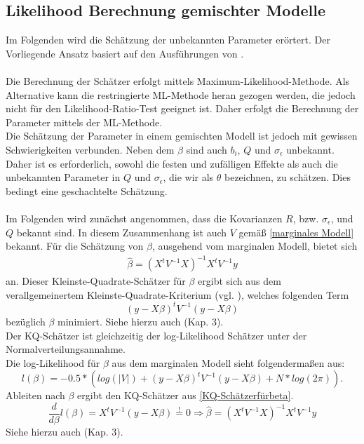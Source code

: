 \documentclass[%
thesis=student,%
coverpage=false,%
titlepage=false,%
headmarks=true, %
german,%
font=libertine, %
math=newpxtx, %
BCOR=5mm,%
coverBCOR=11mm%
]{tumbook}
\theoremstyle{break}
\begin{document}
\subsection{Likelihood Berechnung gemischter Modelle}
Im Folgenden wird die Schätzung der unbekannten Parameter erörtert. Der Vorliegende Ansatz basiert auf den Ausführungen von \cite{fahrmeir-2011-regression}.\\
\\
Die Berechnung der Schätzer erfolgt mittels Maximum-Likelihood-Methode. Als Alternative kann die restringierte ML-Methode heran gezogen werden, die jedoch nicht für den Likelihood-Ratio-Test geeignet ist. Daher erfolgt die Berechnung der Parameter mittels der ML-Methode.\\
Die Schätzung der Parameter in einem gemischten Modell ist jedoch mit gewissen Schwierigkeiten verbunden. Neben dem $\beta$ sind auch $b_i$, $Q$ und $\sigma_\epsilon$ unbekannt. Daher ist es erforderlich, sowohl die festen und zufälligen Effekte als auch die unbekannten Parameter in $Q$ und $\sigma_\epsilon$, die wir als $\theta$ bezeichnen, zu schätzen. Dies bedingt eine geschachtelte Schätzung.\\
\\
Im Folgenden wird zunächst angenommen, dass die Kovarianzen $R$, bzw. $\sigma_\epsilon$, und  $Q$ bekannt sind. In diesem Zusammenhang ist auch $V$ gemäß \ref{marginales Modell} bekannt. Für die Schätzung von $\beta$, ausgehend vom marginalen Modell, bietet sich 
\begin{align}
	\hat{\beta} = (X^t V^{-1}X)^{-1}X^t V^{-1}y \label{KQ-Schätzerfürbeta}
\end{align} an.
Dieser Kleinste-Quadrate-Schätzer für $\beta$ ergibt sich aus dem verallgemeinertem Kleinste-Quadrate-Kriterium (vgl. \cite{KQ-Schätzer}), welches folgenden Term
$$(y-X\beta)^tV^{-1}(y-X\beta)$$ 
bezüglich $\beta$ minimiert. Siehe hierzu auch \cite{fahrmeir-2011-regression} (Kap. 3).\\
Der KQ-Schätzer ist gleichzeitig der log-Likelihood Schätzer unter der Normalverteilungsannahme.\\
Die log-Likelihood für $\beta$ aus dem marginalen Modell sieht folgendermaßen aus:
$$ l(\beta) =  -0.5 * (log(|V|)+ (y-X\beta)^t V^{-1}(y-X\beta) + N * log(2\pi)).$$ 
Ableiten nach $\beta$ ergibt den KQ-Schätzer aus \ref{KQ-Schätzerfürbeta}.
$$\frac{d}{d\beta}l(\beta) = X^t V^{-1} (y-X\beta) \stackrel{!}{=} 0  \Rightarrow \hat{\beta} = (X^t V^{-1}X)^{-1}X^t V^{-1}y$$
Siehe hierzu auch \cite{fahrmeir-2011-regression} (Kap. 3).\\
\end{document}
